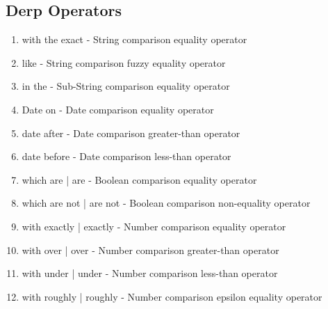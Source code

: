 \subsection{Derp Operators}
\begin{enumerate}
\item with the exact - String comparison equality operator
\item like - String comparison fuzzy equality operator
\item in the - Sub-String comparison equality operator
\item Date on - Date comparison equality operator
\item date after - Date comparison greater-than operator
\item date before - Date comparison less-than operator
\item which are | are - Boolean comparison equality operator
\item which are not | are not - Boolean comparison non-equality operator
\item with exactly | exactly - Number comparison equality operator
\item with over | over - Number comparison greater-than operator
\item with under | under - Number comparison less-than operator
\item with roughly | roughly - Number comparison epsilon equality operator
\end{enumerate}